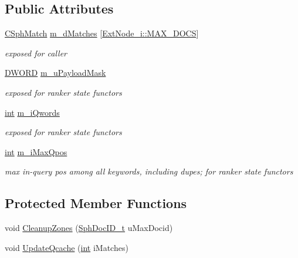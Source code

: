 \subsection*{Public Attributes}
\begin{DoxyCompactItemize}
\item 
\hyperlink{classCSphMatch}{C\-Sph\-Match} \hyperlink{classExtRanker__c_aac790cfc4c2da89f8e71218c1d0e777f}{m\-\_\-d\-Matches} \mbox{[}\hyperlink{classExtNode__i_afe46dd6ff6757d7a0bf3318fd1462bf9}{Ext\-Node\-\_\-i\-::\-M\-A\-X\-\_\-\-D\-O\-C\-S}\mbox{]}
\begin{DoxyCompactList}\small\item\em exposed for caller \end{DoxyCompactList}\item 
\hyperlink{sphinxstd_8h_a798af1e30bc65f319c1a246cecf59e39}{D\-W\-O\-R\-D} \hyperlink{classExtRanker__c_aaf89aef9263ba01d40f8778c141c547f}{m\-\_\-u\-Payload\-Mask}
\begin{DoxyCompactList}\small\item\em exposed for ranker state functors \end{DoxyCompactList}\item 
\hyperlink{sphinxexpr_8cpp_a4a26e8f9cb8b736e0c4cbf4d16de985e}{int} \hyperlink{classExtRanker__c_a99c1bf3bd52c6a8dc25830b1c6a7ba62}{m\-\_\-i\-Qwords}
\begin{DoxyCompactList}\small\item\em exposed for ranker state functors \end{DoxyCompactList}\item 
\hyperlink{sphinxexpr_8cpp_a4a26e8f9cb8b736e0c4cbf4d16de985e}{int} \hyperlink{classExtRanker__c_af62a7edce26552cb1b38b8d99b80b58a}{m\-\_\-i\-Max\-Qpos}
\begin{DoxyCompactList}\small\item\em max in-\/query pos among all keywords, including dupes; for ranker state functors \end{DoxyCompactList}\end{DoxyCompactItemize}
\subsection*{Protected Member Functions}
\begin{DoxyCompactItemize}
\item 
void \hyperlink{classExtRanker__c_a8c5665bc2c8a81c933b56cd2001b3370}{Cleanup\-Zones} (\hyperlink{sphinx_8h_a3176771631c12a9e4897272003e6b447}{Sph\-Doc\-I\-D\-\_\-t} u\-Max\-Docid)
\item 
void \hyperlink{classExtRanker__c_a50a895927a7aeaf0d4a9d95cea89937a}{Update\-Qcache} (\hyperlink{sphinxexpr_8cpp_a4a26e8f9cb8b736e0c4cbf4d16de985e}{int} i\-Matches)
\end{DoxyCompactItemize}
